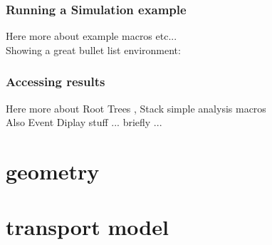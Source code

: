 \subsection{ Running a Simulation example}

Here more about example macros etc... \\

Showing a great bullet list environment:

\subsection{Accessing results}

Here more about Root Trees , Stack simple analysis macros \\
Also Event Diplay stuff ... briefly ...


\chapter{geometry}
\chapter{transport model}

